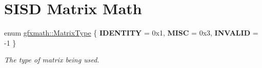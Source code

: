 \hypertarget{group___s_i_s_d_mat_math}{}\section{S\+I\+S\+D Matrix Math}
\label{group___s_i_s_d_mat_math}
\begin{DoxyCompactItemize}
\item 
\hypertarget{group___s_i_s_d_mat_math_ga6c8951c82aec5015dd6806affb4c8d03}{}enum \hyperlink{group___s_i_s_d_mat_math_ga6c8951c82aec5015dd6806affb4c8d03}{gfxmath\+::\+Matrix\+Type} \{ {\bfseries I\+D\+E\+N\+T\+I\+T\+Y} = 0x1, 
{\bfseries M\+I\+S\+C} = 0x3, 
{\bfseries I\+N\+V\+A\+L\+I\+D} = -\/1
 \}\label{group___s_i_s_d_mat_math_ga6c8951c82aec5015dd6806affb4c8d03}

\begin{DoxyCompactList}\small\item\em The type of matrix being used. \end{DoxyCompactList}\end{DoxyCompactItemize}
